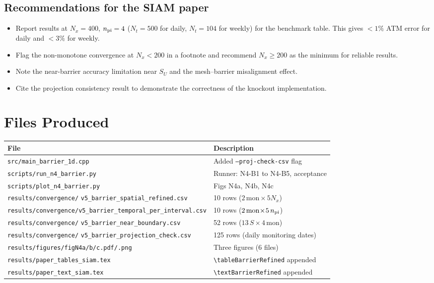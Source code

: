 \documentclass[11pt,a4paper]{article}
\newcommand{\Nx}{N_x}
\newcommand{\Nt}{N_t}
\newcommand{\npi}{n_{\rm pi}}
\newcommand{\SU}{S_U}
\begin{document}
\subsection{Recommendations for the SIAM paper}

\begin{itemize}[noitemsep]
  \item Report results at $\Nx = 400$, $\npi = 4$ ($\Nt = 500$ for
        daily, $\Nt = 104$ for weekly) for the benchmark table.
        This gives $< 1\%$ ATM error for daily and $< 3\%$ for weekly.
  \item Flag the non-monotone convergence at $\Nx < 200$ in a footnote
        and recommend $\Nx \ge 200$ as the minimum for reliable results.
  \item Note the near-barrier accuracy limitation near $\SU$ and the
        mesh--barrier misalignment effect.
  \item Cite the projection consistency result to demonstrate the
        correctness of the knockout implementation.
\end{itemize}

\section{Files Produced}

\begin{center}
\footnotesize
\begin{tabular}{@{}p{8.5cm}p{5.5cm}@{}}
\toprule
File & Description \\
\midrule
\texttt{src/main\_barrier\_1d.cpp} &
  Added \texttt{--proj-check-csv} flag \\
\texttt{scripts/run\_n4\_barrier.py} &
  Runner: N4-B1 to N4-B5, acceptance \\
\texttt{scripts/plot\_n4\_barrier.py} &
  Figs N4a, N4b, N4c \\
\texttt{results/convergence/}%
\texttt{v5\_barrier\_spatial\_refined.csv} &
  10 rows ($2\,\text{mon}\!\times\!5\Nx$) \\
\nolinkurl{results/convergence/v5_barrier_temporal_per_interval.csv} &
  10 rows ($2\,\text{mon}\!\times\!5\,\npi$) \\
\texttt{results/convergence/}%
\texttt{v5\_barrier\_near\_boundary.csv} &
  52 rows ($13\,S \times 4\,\text{mon}$) \\
\texttt{results/convergence/}%
\texttt{v5\_barrier\_projection\_check.csv} &
  125 rows (daily monitoring dates) \\
\texttt{results/figures/figN4a/b/c.pdf/.png} &
  Three figures (6 files) \\
\texttt{results/paper\_tables\_siam.tex} &
  \verb|\tableBarrierRefined| appended \\
\texttt{results/paper\_text\_siam.tex} &
  \verb|\textBarrierRefined| appended \\
\bottomrule
\end{tabular}
\end{center}
\end{document}

